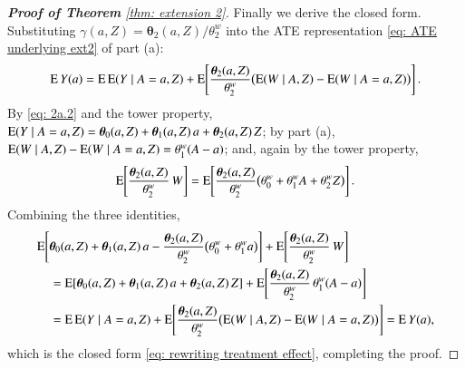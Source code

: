 \begin{proof}[\hypertarget{proof of thm extension 2}{\textbf{Proof of Theorem}} \ref{thm: extension 2}]
Finally we derive the closed form. Substituting $\gamma(a,Z)=\boldsymbol{\theta}_2(a,Z)/\theta_2^w$ into the ATE representation \eqref{eq: ATE underlying ext2} of part (a):
\[
\mathrm{E} \, Y(a) = \mathrm{E}\,\mathrm{E}(Y\mid A=a,Z) + \mathrm{E}\!\left[\frac{\boldsymbol{\theta}_2(a,Z)}{\theta_2^w}\big(\mathrm{E}(W\mid A,Z)-\mathrm{E}(W\mid A=a,Z)\big)\right].
\]
By \eqref{eq: 2a.2} and the tower property, $\mathrm{E}(Y\mid A=a,Z)=\boldsymbol{\theta}_0(a,Z)+\boldsymbol{\theta}_1(a,Z)\,a+\boldsymbol{\theta}_2(a,Z)\,Z$; by part (a), $\mathrm{E}(W\mid A,Z)-\mathrm{E}(W\mid A=a,Z)=\theta_1^w(A-a)$; and, again by the tower property,
\[
\mathrm{E}\!\left[\frac{\boldsymbol{\theta}_2(a,Z)}{\theta_2^w}\,W\right]
=\mathrm{E}\!\left[
\frac{\boldsymbol{\theta}_2(a,Z)}{\theta_2^w}
\big(\theta_0^w+\theta_1^wA+\theta_2^w Z\big)
\right].
\]
Combining the three identities,
\begin{align*}
&\mathrm{E}\!\left[\boldsymbol{\theta}_0(a,Z)+\boldsymbol{\theta}_1(a,Z)\,a-\frac{\boldsymbol{\theta}_2(a,Z)}{\theta_2^w}\big(\theta_0^w+\theta_1^w a\big)\right]
+\mathrm{E}\!\left[\frac{\boldsymbol{\theta}_2(a,Z)}{\theta_2^w}\,W\right] \\
&\quad=\mathrm{E}\!\left[\boldsymbol{\theta}_0(a,Z)+\boldsymbol{\theta}_1(a,Z)\,a+\boldsymbol{\theta}_2(a,Z)\,Z\right]
+\mathrm{E}\!\left[\frac{\boldsymbol{\theta}_2(a,Z)}{\theta_2^w}\,\theta_1^w(A-a)\right] \\
&\quad=\mathrm{E}\,\mathrm{E}(Y\mid A=a,Z)
+\mathrm{E}\!\left[\frac{\boldsymbol{\theta}_2(a,Z)}{\theta_2^w}\big(\mathrm{E}(W\mid A,Z)-\mathrm{E}(W\mid A=a,Z)\big)\right]
=\mathrm{E} \, Y(a),
\end{align*}
which is the closed form \eqref{eq: rewriting treatment effect}, completing the proof.
\end{proof}


